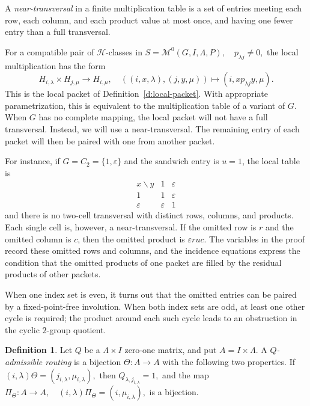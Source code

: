 \documentclass[11pt]{article}
\theoremstyle{plain}
\theoremstyle{remark}
\theoremstyle{definition}
\newtheorem{definition}[theorem]{Definition}
\theoremstyle{plain}
\begin{document}
A \emph{near-transversal} in a finite multiplication table is a set of entries meeting each row, each column, and each product value at most once, and having one fewer entry than a full transversal.

For a compatible pair of $\mathcal{H}$-classes in
\(S=\mathcal M^0(G,I,\Lambda,P), \quad p_{\lambda j}\ne0,\)
the local multiplication has the form
\[
H_{i,\lambda}\times H_{j,\mu}
        \longrightarrow H_{i,\mu},
        \quad
        ((i,x,\lambda),(j,y,\mu))\longmapsto (i,xp_{\lambda j}y,\mu).
\]
This is the local packet of Definition~\ref{d:local-packet}.
With appropriate parametrization, this is equivalent to the multiplication table of a variant of $G$.
When $G$ has no complete mapping, the local packet will not have a full transversal. Instead, we will use a near-transversal. The remaining entry of each packet will then be paired with one from another packet.

For instance, if $G=C_2=\{1,\varepsilon\}$ and the sandwich entry is $u=1$, the
local table is
\[
\begin{array}{c|cc}
        x\backslash y & 1 & \varepsilon \\ \hline
        1 & 1 & \varepsilon \\
        \varepsilon & \varepsilon & 1
\end{array}
\]
and there is no two-cell transversal with distinct rows, columns, and products.
Each single cell is, however, a near-transversal. If the omitted row is $r$ and
the omitted column is $c$, then the omitted product is $\varepsilon ruc$. The
variables in the proof record these omitted rows and columns, and the incidence
equations express the condition that the omitted products of one packet are
filled by the residual products of other packets.

When one index set is even, it turns out that the omitted entries can be paired by a fixed-point-free
involution. When both index sets are odd, at least one other cycle is required;
the product around each such cycle leads to an obstruction in the cyclic
$2$-group quotient.

\begin{definition}\label{d:Q-admissible-routing}
Let $Q$ be a $\Lambda\times I$ zero-one matrix, and put
\(A=I\times\Lambda.\)
A \emph{$Q$-admissible routing} is a bijection
\(\Theta\colon A\longrightarrow A\)
with the following two properties. If
\((i,\lambda)\Theta=(j_{i,\lambda},\mu_{i,\lambda}),\)
then
\(Q_{\lambda,j_{i,\lambda}}=1,\)
and the map
\(\Pi_\Theta\colon A\longrightarrow A, \quad (i,\lambda)\Pi_\Theta=(i,\mu_{i,\lambda}),\)
is a bijection.
\end{definition}
\end{document}
